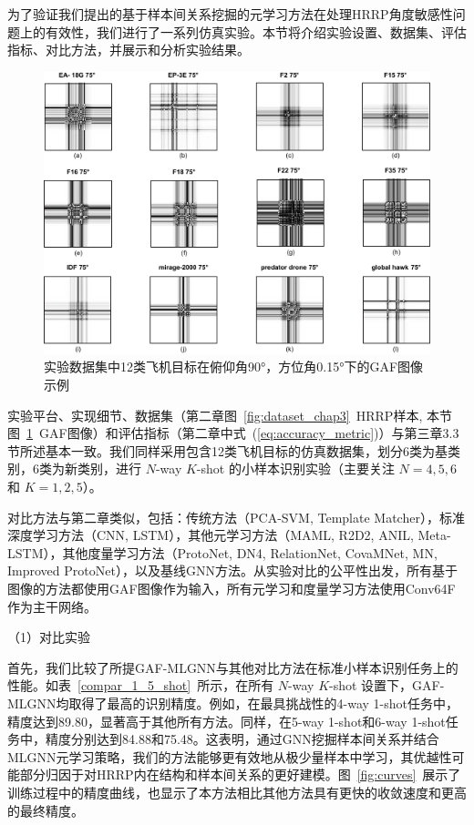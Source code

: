 为了验证我们提出的基于样本间关系挖掘的元学习方法在处理HRRP角度敏感性问题上的有效性，我们进行了一系列仿真实验。本节将介绍实验设置、数据集、评估指标、对比方法，并展示和分析实验结果。


\begin{figure}[!h]
\centering
\includegraphics[width=0.75\linewidth]{figures/gaf_samples.pdf}
\caption{实验数据集中12类飞机目标在俯仰角90°，方位角0.15°下的GAF图像示例}
\label{fig:gaf_samples}
\end{figure}

实验平台、实现细节、数据集（第二章图~\ref{fig:dataset_chap3}~HRRP样本, 本节图~\ref{fig:gaf_samples}~GAF图像）和评估指标（第二章中式~(\ref{eq:accuracy_metric})）与第三章3.3节所述基本一致。我们同样采用包含12类飞机目标的仿真数据集，划分6类为基类别，6类为新类别，进行 $N$-way $K$-shot 的小样本识别实验（主要关注 $N=4, 5, 6$ 和 $K=1, 2, 5$）。


对比方法与第二章类似，包括：传统方法（PCA-SVM, Template Matcher），标准深度学习方法（CNN, LSTM），其他元学习方法（MAML, R2D2, ANIL, Meta-LSTM），其他度量学习方法（ProtoNet, DN4, RelationNet, CovaMNet, MN, Improved ProtoNet），以及基线GNN方法。从实验对比的公平性出发，所有基于图像的方法都使用GAF图像作为输入，所有元学习和度量学习方法使用Conv64F作为主干网络。

（1）对比实验

首先，我们比较了所提GAF-MLGNN与其他对比方法在标准小样本识别任务上的性能。如表~\ref{compar_1_5_shot}~所示，在所有 $N$-way $K$-shot 设置下，GAF-MLGNN均取得了最高的识别精度。例如，在最具挑战性的4-way 1-shot任务中，精度达到89.80，显著高于其他所有方法。同样，在5-way 1-shot和6-way 1-shot任务中，精度分别达到84.88和75.48。这表明，通过GNN挖掘样本间关系并结合MLGNN元学习策略，我们的方法能够更有效地从极少量样本中学习，其优越性可能部分归因于对HRRP内在结构和样本间关系的更好建模。图~\ref{fig:curves}~展示了训练过程中的精度曲线，也显示了本方法相比其他方法具有更快的收敛速度和更高的最终精度。

